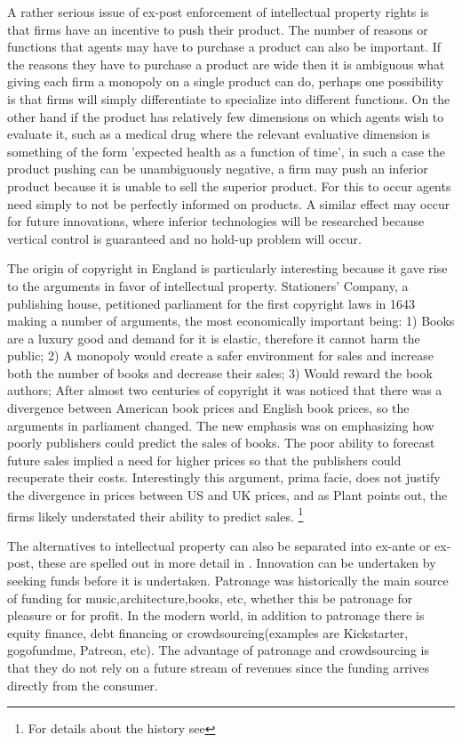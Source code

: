 \documentclass[12pt]{article}
\numberwithin{equation}{section}
\begin{document}
A rather serious issue of ex-post enforcement of intellectual property rights is that firms have an incentive to push their product. The number of reasons or functions that agents may have to purchase a product can also be important. If the reasons they have to purchase a product are wide then it is ambiguous what giving each firm a monopoly on a single product can do, perhaps one possibility is that firms will simply differentiate to specialize into different functions. On the other hand if the product has relatively few dimensions on which agents wish to evaluate it, such as a medical drug where the relevant evaluative dimension is something of the form 'expected health as a function of time', in such a case the product pushing can be unambiguously negative, a firm may push an inferior product because it is unable to sell the superior product. For this to occur agents need simply to not be perfectly informed on products. A similar effect may occur for future innovations, where inferior technologies will be researched because vertical control is guaranteed and no hold-up problem will occur. 


The origin of copyright in England is particularly interesting because it gave rise to the arguments in favor of intellectual property. Stationers' Company, a publishing house, petitioned parliament for the first copyright laws in 1643 making a number of arguments, the most economically important being: 1) Books are a luxury good and demand for it is elastic, therefore it cannot harm the public; 2) A monopoly would create a safer environment for sales and increase both the number of books and decrease their sales; 3) Would reward the book authors; After almost two centuries of copyright it was noticed that there was a divergence between American book prices and English book prices, so the arguments in parliament changed. The new emphasis was on emphasizing how poorly publishers could predict the sales of books. The poor ability to forecast future sales implied a need for higher prices so that the publishers could recuperate their costs. Interestingly this argument, prima facie, does  not justify the divergence in prices between US and UK prices, and as Plant points out, the firms likely understated their ability to predict sales. \footnote{For details about the history see\cite{Plant1934}}


The alternatives to intellectual property can also be separated into ex-ante or ex-post, these are spelled out in more detail in \cite{boldrinlevine}. Innovation can be undertaken by seeking funds before it is undertaken. Patronage was historically the main source of funding for music,architecture,books, etc, whether this be patronage for pleasure or for profit. In the modern world, in addition to patronage there is equity finance, debt financing or crowdsourcing(examples are Kickstarter, gogofundme, Patreon, etc). The advantage of patronage and crowdsourcing is that they do not rely on a future stream of revenues since the funding arrives directly from the consumer. 
\end{document}
